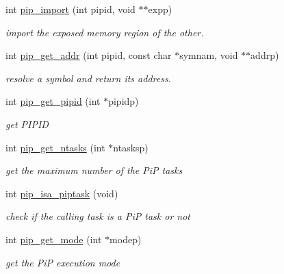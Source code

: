 \begin{DoxyCompactItemize}
\item 
int \hyperlink{group__libpip_ga6d7ac596a9da824e40d7c06528f42e5f}{pip\-\_\-import} (int pipid, void $\ast$$\ast$expp)
\begin{DoxyCompactList}\small\item\em import the exposed memory region of the other. \end{DoxyCompactList}\end{DoxyCompactItemize}
\begin{DoxyCompactItemize}
\item 
int \hyperlink{group__libpip_gaa0f8ce0138a1abb22ee5cb4d2230abc5}{pip\-\_\-get\-\_\-addr} (int pipid, const char $\ast$symnam, void $\ast$$\ast$addrp)
\begin{DoxyCompactList}\small\item\em resolve a symbol and return its address. \end{DoxyCompactList}\end{DoxyCompactItemize}
\begin{DoxyCompactItemize}
\item 
int \hyperlink{group__libpip_ga4e715bb8c325e9acc81af0745908dc0e}{pip\-\_\-get\-\_\-pipid} (int $\ast$pipidp)
\begin{DoxyCompactList}\small\item\em get P\-I\-P\-I\-D \end{DoxyCompactList}\end{DoxyCompactItemize}
\begin{DoxyCompactItemize}
\item 
int \hyperlink{group__libpip_ga9786d5aafa2a3882714c35ecc9f39a5a}{pip\-\_\-get\-\_\-ntasks} (int $\ast$ntasksp)
\begin{DoxyCompactList}\small\item\em get the maximum number of the Pi\-P tasks \end{DoxyCompactList}\end{DoxyCompactItemize}
\begin{DoxyCompactItemize}
\item 
int \hyperlink{group__libpip_ga4b6905e1eb5ffa6427d72d7e73408639}{pip\-\_\-isa\-\_\-piptask} (void)
\begin{DoxyCompactList}\small\item\em check if the calling task is a Pi\-P task or not \end{DoxyCompactList}\end{DoxyCompactItemize}
\begin{DoxyCompactItemize}
\item 
int \hyperlink{group__libpip_gab603f68c1ce972a5f3bfb8c95fcfb555}{pip\-\_\-get\-\_\-mode} (int $\ast$modep)
\begin{DoxyCompactList}\small\item\em get the Pi\-P execution mode \end{DoxyCompactList}\end{DoxyCompactItemize}
